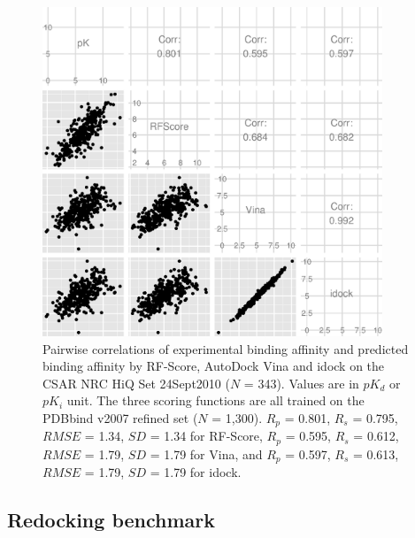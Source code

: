 \begin{figure}
\begin{center}
\includegraphics[width=4in]{../istar/CSAR2010Correlations.eps}
\end{center}
\caption{Pairwise correlations of experimental binding affinity and predicted binding affinity by RF-Score, AutoDock Vina and idock on the CSAR NRC HiQ Set 24Sept2010 ($N$ = 343). Values are in $pK_d$ or $pK_i$ unit. The three scoring functions are all trained on the PDBbind v2007 refined set ($N$ = 1,300). $R_p$ = 0.801, $R_s$ = 0.795, $RMSE$ = 1.34, $SD$ = 1.34 for RF-Score, $R_p$ = 0.595, $R_s$ = 0.612, $RMSE$ = 1.79, $SD$ = 1.79 for Vina, and $R_p$ = 0.597, $R_s$ = 0.613, $RMSE$ = 1.79, $SD$ = 1.79 for idock.}
\label{CSAR2010Correlations}
\end{figure}

\subsection{Redocking benchmark}


